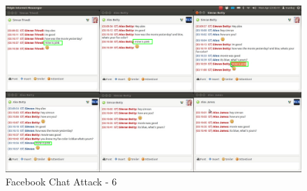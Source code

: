 \begin{figure}[H]
\centering
\includegraphics[scale=0.6, angle=90]{project/diagrams/attack6}
\caption{Facebook Chat Attack - 6}
\label{fig:attack1}
\end{figure}

